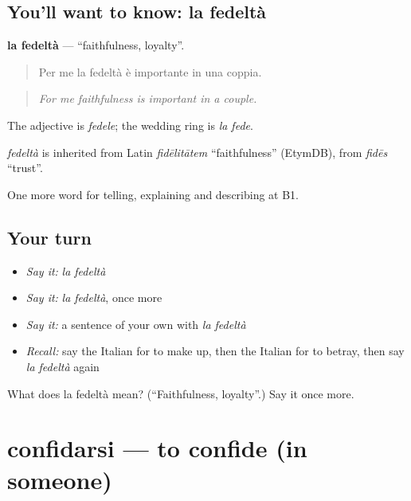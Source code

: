 \subsection*{You'll want to know: la fedeltà}
\textbf{la fedeltà} — \textquotedblleft{}faithfulness, loyalty\textquotedblright{}.

\begin{quote}
Per me la fedeltà è importante in una coppia.
\end{quote}

\begin{quote}
\emph{For me faithfulness is important in a couple.}
\end{quote}

The adjective is \emph{fedele}; the wedding ring is \emph{la fede}.

\begin{cousinweb}
\emph{fedeltà} is inherited from Latin \emph{fidēlitātem} \textquotedblleft{}faithfulness\textquotedblright{} (EtymDB), from \emph{fidēs} \textquotedblleft{}trust\textquotedblright{}.
\end{cousinweb}

\begin{grammarlens}[title={What you've built}]
One more word for telling, explaining and describing at B1.
\end{grammarlens}

\subsection*{Your turn}
\begin{itemize}
\raggedright
  \item \emph{Say it:} \emph{la fedeltà}
  \item \emph{Say it:} \emph{la fedeltà}, once more
  \item \emph{Say it:} a sentence of your own with \emph{la fedeltà}
  \item \emph{Recall:} say the Italian for to make up, then the Italian for to betray, then say \emph{la fedeltà} again
\end{itemize}

\begin{tcolorbox}[breakable,colback=teal!4,colframe=teal!35!black,title={Before you move on}]
What does la fedeltà mean? (\textquotedblleft{}Faithfulness, loyalty\textquotedblright{}.) Say it once more.
\end{tcolorbox}
\section[confidarsi]{confidarsi — to confide (in someone)}

